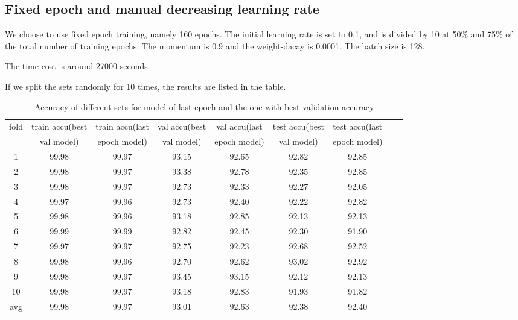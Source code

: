 \subsection{Fixed epoch and manual decreasing learning rate}
We choose to use fixed epoch training, namely 160 epochs.
The initial learning rate is set to 0.1, and is divided by 10 at 50\% and 75\% of the total number of training epochs.
The momentum is 0.9 and the weight-dacay is 0.0001. The batch size is 128.

The time cost is around 27000 seconds.

If we split the sets randomly for 10 times, the results are listed in the table.
\begin{table}[!htbp]
	\centering
	\caption{Accuracy of different sets for model of  last epoch and the one with best validation accuracy }
	\label{table:cv3}
	\begin{tabular}{|c|c|c|c|c|c|c|c|c|}
		\hline
%		
fold	&	train accu(best	&	train accu(last	&	val accu(best	&	val accu(last	&	test accu(best 	&	test accu(last	\\
	&	 val model)	&	 epoch model)	&	val model)	&	 epoch model)	&	val model)	&	 epoch model)	\\\hline
1	&	99.98	&	99.97	&	93.15	&	92.65	&	92.82	&	92.85	\\\hline
2	&	99.98	&	99.97	&	93.38	&	92.78	&	92.35	&	92.85	\\\hline
3	&	99.98	&	99.97	&	92.73	&	92.33	&	92.27	&	92.05	\\\hline
4	&	99.97	&	99.96	&	92.73	&	92.40	&	92.22	&	92.82	\\\hline
5	&	99.98	&	99.96	&	93.18	&	92.85	&	92.13	&	92.13	\\\hline
6	&	99.99	&	99.99	&	92.82	&	92.45	&	92.30	&	91.90	\\\hline
7	&	99.97	&	99.97	&	92.75	&	92.23	&	92.68	&	92.52	\\\hline
8	&	99.98	&	99.96	&	92.70	&	92.62	&	93.02	&	92.92	\\\hline
9	&	99.98	&	99.97	&	93.45	&	93.15	&	92.12	&	92.13	\\\hline
10	&	99.98	&	99.97	&	93.18	&	92.83	&	91.93	&	91.82	\\\hline
avg	&	99.98	&	99.97	&	93.01	&	92.63	&	92.38	&	92.40	\\\hline
	\end{tabular}
\end{table}


